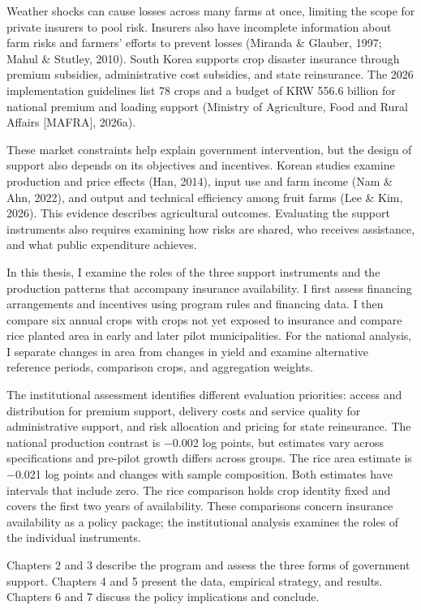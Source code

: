 
Weather shocks can cause losses across many farms at once, limiting the scope for private insurers to pool risk. Insurers also have incomplete information about farm risks and farmers' efforts to prevent losses (Miranda \& Glauber, 1997; Mahul \& Stutley, 2010). South Korea supports crop disaster insurance through premium subsidies, administrative cost subsidies, and state reinsurance. The 2026 implementation guidelines list 78 crops and a budget of KRW 556.6 billion for national premium and loading support (Ministry of Agriculture, Food and Rural Affairs [MAFRA], 2026a).

These market constraints help explain government intervention, but the design of support also depends on its objectives and incentives. Korean studies examine production and price effects (Han, 2014), input use and farm income (Nam \& Ahn, 2022), and output and technical efficiency among fruit farms (Lee \& Kim, 2026). This evidence describes agricultural outcomes. Evaluating the support instruments also requires examining how risks are shared, who receives assistance, and what public expenditure achieves.

In this thesis, I examine the roles of the three support instruments and the production patterns that accompany insurance availability. I first assess financing arrangements and incentives using program rules and financing data. I then compare six annual crops with crops not yet exposed to insurance and compare rice planted area in early and later pilot municipalities. For the national analysis, I separate changes in area from changes in yield and examine alternative reference periods, comparison crops, and aggregation weights.

The institutional assessment identifies different evaluation priorities: access and distribution for premium support, delivery costs and service quality for administrative support, and risk allocation and pricing for state reinsurance. The national production contrast is −0.002 log points, but estimates vary across specifications and pre-pilot growth differs across groups. The rice area estimate is −0.021 log points and changes with sample composition. Both estimates have intervals that include zero. The rice comparison holds crop identity fixed and covers the first two years of availability. These comparisons concern insurance availability as a policy package; the institutional analysis examines the roles of the individual instruments.

Chapters 2 and 3 describe the program and assess the three forms of government support. Chapters 4 and 5 present the data, empirical strategy, and results. Chapters 6 and 7 discuss the policy implications and conclude.
